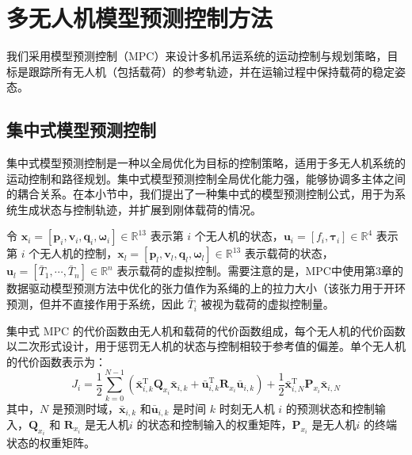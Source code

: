 \documentclass[lang=chs, degree=master, blindreview=false, winfonts=true]{yanputhesis}
\begin{document}

\section{多无人机模型预测控制方法}
我们采用模型预测控制（MPC）来设计多机吊运系统的运动控制与规划策略，目标是跟踪所有无人机（包括载荷）的参考轨迹，并在运输过程中保持载荷的稳定姿态。
\subsection{集中式模型预测控制}


集中式模型预测控制是一种以全局优化为目标的控制策略，适用于多无人机系统的运动控制和路径规划。集中式模型预测控制全局优化能力强，能够协调多主体之间的耦合关系。在本小节中，我们提出了一种集中式的模型预测控制公式，用于为系统生成状态与控制轨迹，并扩展到刚体载荷的情况。

令 \( \bm x_i = \left[ \bm p_i, \bm v_i, \bm q_i, \bm \omega_i \right] \in \mathbb{R}^{13} \) 表示第 \( i \) 个无人机的状态，\( \bm u_i = \left[ f_i, \bm \tau_i \right] \in \mathbb{R}^4 \) 表示第 \( i \) 个无人机的控制，\( \bm x_l = \left[ \bm p_l, \bm v_l, \bm q_l, \bm \omega_l \right] \in \mathbb{R}^{13} \) 表示载荷的状态，\( \bm u_l = \left[ \bar{T}_1, \cdots, \bar{T}_n \right] \in \mathbb{R}^n \) 表示载荷的虚拟控制。需要注意的是，MPC中使用第3章的数据驱动模型预测方法中优化的张力值作为系绳的上的拉力大小（该张力用于开环预测，但并不直接作用于系统，因此 \( \bar{T}_i \) 被视为载荷的虚拟控制量。

集中式 MPC 的代价函数由无人机和载荷的代价函数组成，每个无人机的代价函数以二次形式设计，用于惩罚无人机的状态与控制相较于参考值的偏差。单个无人机的代价函数表示为：
\begin{equation}
	J_i = \frac{1}{2}\sum_{k=0}^{N-1}\left(\bar{\boldsymbol{x}}_{i,k}^\mathrm{T}\boldsymbol{Q}_{x_i}\bar{\boldsymbol{x}}_{i,k}+\bar{\boldsymbol{u}}_{i,k}^\mathrm{T}\boldsymbol{R}_{x_i}\bar{\boldsymbol{u}}_{i,k}\right)+\frac{1}{2}\bar{\boldsymbol{x}}_{i,N}^\mathrm{T}\boldsymbol{P}_{x_i}\bar{\boldsymbol{x}}_{i,N}
	\label{juav}
\end{equation}
其中，$N$ 是预测时域，$\bar{\boldsymbol{x}}_{i,k}$ 和$\bar{\boldsymbol{u}}_{i,k}$ 是时间 $k$ 时刻无人机 $i$ 的预测状态和控制输入，$\boldsymbol{Q}_{x_i}$ 和 $\boldsymbol{R}_{x_i}$ 是无人机$i$ 的状态和控制输入的权重矩阵，$\boldsymbol{P}_{x_i}$ 是无人机$i$ 的终端状态的权重矩阵。
\end{document}

